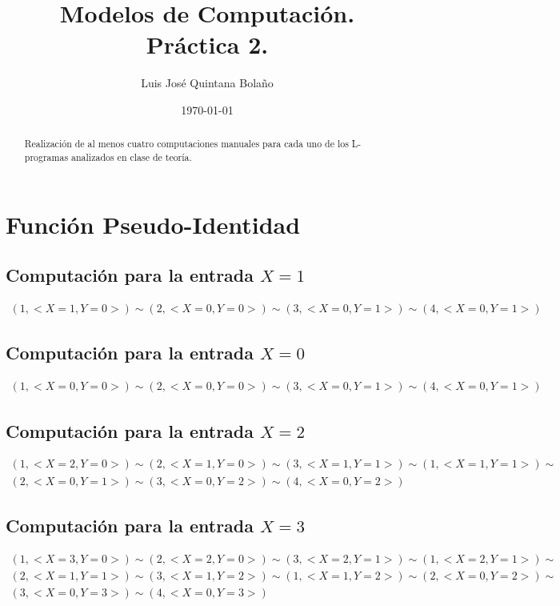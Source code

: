 \documentclass[a4paper]{article}
\title{Modelos de Computación.\\ Práctica 2. }
\author{Luis José Quintana Bolaño}
\date{\today}
\begin{document}
		\maketitle
		\begin{abstract}
		    Realización de al menos cuatro computaciones manuales para cada uno de los L-programas analizados en clase de teoría.
  		\end{abstract}

  		\section{Función Pseudo-Identidad}
		\subsection{Computación para la entrada $X=1$}
		\begin{equation*}\begin{gathered}
		(1, <X=1, Y=0>) \sim (2, <X=0, Y=0>) \sim (3, <X=0, Y=1>) \sim (4, <X=0, Y=1>)
		\end{gathered}\end{equation*}
		\subsection{Computación para la entrada $X=0$}
		\begin{equation*}\begin{gathered}
		(1, <X=0, Y=0>) \sim (2, <X=0, Y=0>) \sim (3, <X=0, Y=1>) \sim (4, <X=0, Y=1>)
		\end{gathered}\end{equation*}
		\subsection{Computación para la entrada $X=2$}
		\begin{equation*}\begin{gathered}
		(1, <X=2, Y=0>) \sim (2, <X=1, Y=0>) \sim (3, <X=1, Y=1>) \sim (1, <X=1, Y=1>) \sim\\
		(2, <X=0, Y=1>) \sim (3, <X=0, Y=2>) \sim (4, <X=0, Y=2>)
		\end{gathered}\end{equation*}
		\subsection{Computación para la entrada $X=3$}
		\begin{equation*}\begin{gathered}
		(1, <X=3, Y=0>) \sim (2, <X=2, Y=0>) \sim (3, <X=2, Y=1>) \sim (1, <X=2, Y=1>) \sim\\
		(2, <X=1, Y=1>) \sim (3, <X=1, Y=2>) \sim (1, <X=1, Y=2>) \sim (2, <X=0, Y=2>) \sim\\
		(3, <X=0, Y=3>) \sim (4, <X=0, Y=3>)
		\end{gathered}\end{equation*}
\end{document}
